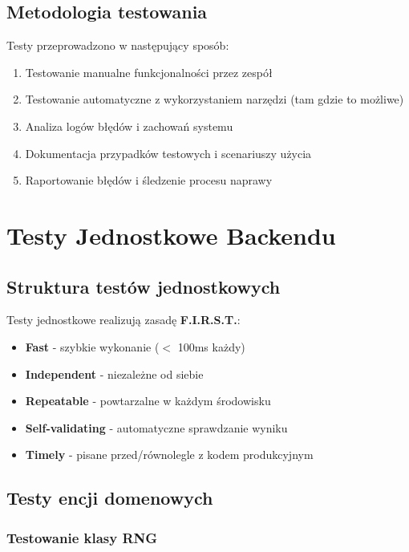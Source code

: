 \documentclass[12pt,a4paper]{article}
\begin{document}
\subsection{Metodologia testowania}

Testy przeprowadzono w następujący sposób:

\begin{enumerate}
    \item Testowanie manualne funkcjonalności przez zespół
    \item Testowanie automatyczne z wykorzystaniem narzędzi (tam gdzie to możliwe)
    \item Analiza logów błędów i zachowań systemu
    \item Dokumentacja przypadków testowych i scenariuszy użycia
    \item Raportowanie błędów i śledzenie procesu naprawy
\end{enumerate}

\section{Testy Jednostkowe Backendu}

\subsection{Struktura testów jednostkowych}

Testy jednostkowe realizują zasadę \textbf{F.I.R.S.T.}:
\begin{itemize}
    \item \textbf{Fast} - szybkie wykonanie ($<$ 100ms każdy)
    \item \textbf{Independent} - niezależne od siebie
    \item \textbf{Repeatable} - powtarzalne w każdym środowisku
    \item \textbf{Self-validating} - automatyczne sprawdzanie wyniku
    \item \textbf{Timely} - pisane przed/równolegle z kodem produkcyjnym
\end{itemize}

\subsection{Testy encji domenowych}

\subsubsection{Testowanie klasy RNG}
\end{document}
